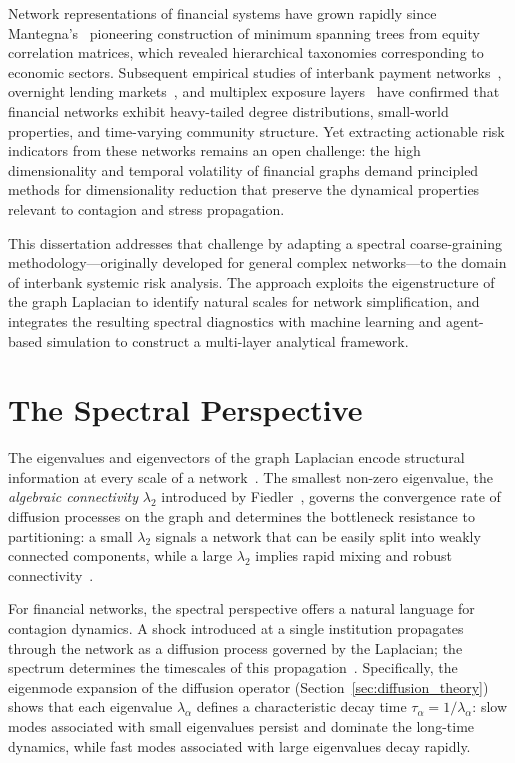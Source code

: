 Network representations of financial systems have grown rapidly since
Mantegna's~\cite{mantegna1999hierarchical} pioneering construction of
minimum spanning trees from equity correlation matrices, which revealed
hierarchical taxonomies corresponding to economic sectors.  Subsequent
empirical studies of interbank payment networks~\cite{soramaki2007topology},
overnight lending markets~\cite{iori2008network}, and multiplex exposure
layers~\cite{bargigli2015multiplex,aldasoro2018multiplex} have confirmed
that financial networks exhibit heavy-tailed degree distributions,
small-world properties, and time-varying community structure.  Yet
extracting actionable risk indicators from these networks remains an open
challenge: the high dimensionality and temporal volatility of financial
graphs demand principled methods for dimensionality reduction that
preserve the dynamical properties relevant to contagion and stress
propagation.

This dissertation addresses that challenge by adapting a spectral
coarse-graining methodology---originally developed for general complex
networks---to the domain of interbank systemic risk analysis.  The
approach exploits the eigenstructure of the graph Laplacian to identify
natural scales for network simplification, and integrates the resulting
spectral diagnostics with machine learning and agent-based simulation to
construct a multi-layer analytical framework.

\section{The Spectral Perspective}
\label{sec:spectral_perspective}

The eigenvalues and eigenvectors of the graph Laplacian encode structural
information at every scale of a network~\cite{chung1997spectral}.  The
smallest non-zero eigenvalue, the \emph{algebraic connectivity}
$\lambda_2$ introduced by Fiedler~\cite{fiedler1973algebraic}, governs
the convergence rate of diffusion processes on the graph and determines the
bottleneck resistance to partitioning: a small $\lambda_2$ signals a
network that can be easily split into weakly connected components, while
a large $\lambda_2$ implies rapid mixing and robust
connectivity~\cite{luxburg2007tutorial}.

For financial networks, the spectral perspective offers a natural
language for contagion dynamics.  A shock introduced at a single
institution propagates through the network as a diffusion process
governed by the Laplacian; the spectrum determines the timescales of
this propagation~\cite{masuda2017random}.  Specifically, the
eigenmode expansion of the diffusion operator (Section~\ref{sec:diffusion_theory})
shows that each eigenvalue $\lambda_\alpha$ defines a characteristic
decay time $\tau_\alpha = 1/\lambda_\alpha$: slow modes associated
with small eigenvalues persist and dominate the long-time dynamics,
while fast modes associated with large eigenvalues decay rapidly.


